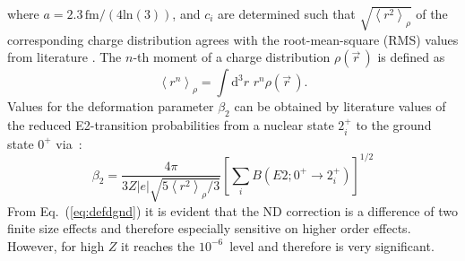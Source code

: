 where $a=2.3\,\text{fm}/(4\text{ln}(3))$, and $c_i$ are determined such that $\sqrt{\left<r^2\right>_{\rho}}$ of the corresponding charge distribution agrees with the root-mean-square (RMS) values from literature \cite{Angeli2013}. The $n$-th moment of a charge distribution $\rho(\vec{r}\,)$ is defined as
\begin{equation}
\left< r^n \right>_{\rho} = \int \text{d}^3r\,\, r^n \rho(\vec{r}\,).
\label{eq:nmoment}
\end{equation}
Values for the deformation parameter $\beta_2$ can be obtained by literature values of the reduced E2-transition probabilities from a nuclear state $2^+_i$ to the ground state $0^+$ via~\cite{Trager}:
\begin{equation}
\beta_2 = \frac{4\pi}{3Z|e|\sqrt{5\left< r^2\right>_{\rho} /3}}\left[ \sum_i B(E2;0^+\rightarrow 2_i^+) \right]^{1/2}
\label{eq:beta}
\end{equation}
From Eq.~(\ref{eq:defdgnd}) it is evident that the ND correction is a difference of two finite size effects and therefore especially sensitive on higher order effects. However, for high $Z$ it reaches the $10^{-6}$~level and therefore is very significant.

